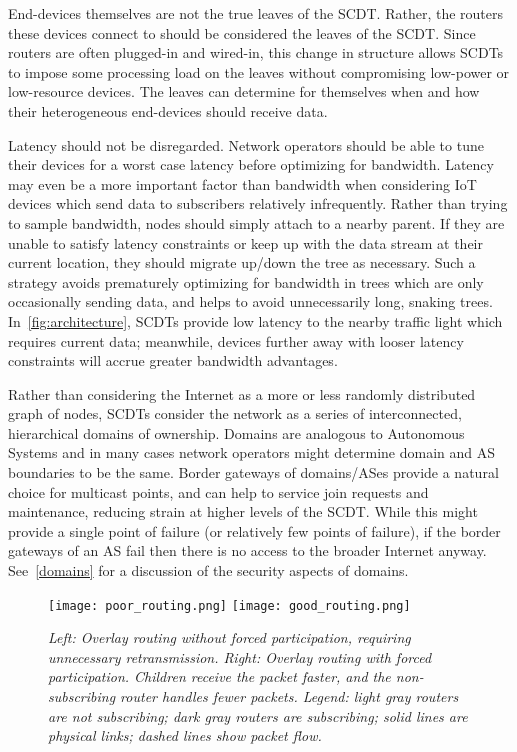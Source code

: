 End-devices themselves are not the true leaves of the SCDT.  Rather, the routers
these devices connect to should be considered the leaves of the SCDT.  Since
routers are often plugged-in and wired-in, this change in structure allows SCDTs
to impose some processing load on the leaves without compromising low-power or
low-resource devices.  The leaves can determine for themselves when and how
their heterogeneous end-devices should receive data.

Latency should not be disregarded.  Network operators should be able to tune
their devices for a worst case latency before
optimizing for bandwidth.  Latency may even be a more important factor than
bandwidth when considering IoT devices which send data to subscribers relatively
infrequently.  Rather than trying to sample bandwidth, nodes should simply
attach to a nearby parent.  If they are unable to satisfy latency constraints or
keep up with the data stream at their current location, they should migrate
up/down the tree as necessary.  Such a strategy avoids prematurely optimizing
for bandwidth in trees which are only occasionally sending data, and helps to
avoid unnecessarily long, snaking trees.  In~\autoref{fig:architecture}, SCDTs 
provide low latency
to the nearby traffic light which requires current data; meanwhile, devices
further away with looser latency constraints will accrue greater bandwidth
advantages. 

Rather than considering the Internet as a more or less randomly
distributed graph of nodes, SCDTs consider the network as a series of
interconnected, hierarchical domains of ownership.  Domains are analogous to
Autonomous Systems \cite{RFC1930} and in many cases network operators might
determine domain and AS boundaries to be the same.  Border gateways of
domains/ASes provide a natural choice for multicast points, and can help to
service join requests and maintenance, reducing strain at higher levels of the
SCDT.  While this might provide a single point of failure (or relatively few
points of failure), if the border gateways of an AS fail then there is no access to the
broader Internet anyway.  See~\autoref{domains} for a discussion of the security aspects of domains.

\begin{figure}[t]
	\begin{center}
		\texttt{[image: poor\_routing.png]}
		\texttt{[image: good\_routing.png]}
	\end{center}
	\vspace{-1.3em}
	\caption{\small \itshape Left: Overlay routing without forced participation, requiring unnecessary retransmission.  Right: Overlay routing with forced participation.  Children receive the packet faster, and the non-subscribing router handles fewer packets.  Legend: light gray routers are not subscribing; dark gray routers are subscribing; solid lines are physical links; dashed lines show packet flow.}
	\vspace{-1em}
	\label{fig:overlay-tree}
\end{figure}

